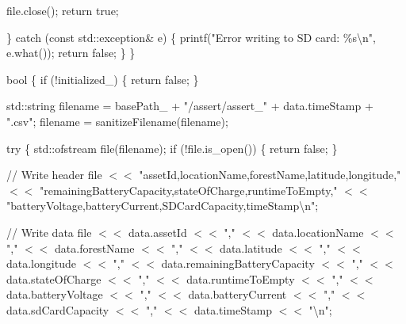 file.\+close(); return true;

\} catch (const std\+::exception\& e) \{ printf("{}\+Error writing to SD card\+: \%s\textbackslash{}n"{}, e.\+what()); return false; \} \}

bool  \{ if (!initialized\+\_\+) \{ return false; \}

std\+::string filename = base\+Path\+\_\+ + "{}/assert/assert\+\_\+"{} + data.\+time\+Stamp + "{}.\+csv"{}; filename = sanitize\+Filename(filename);

try \{ std\+::ofstream file(filename); if (!file.is\+\_\+open()) \{ return false; \}

// Write header file \texorpdfstring{$<$}{<}\texorpdfstring{$<$}{<} "{}asset\+Id,location\+Name,forest\+Name,latitude,longitude,"{} \texorpdfstring{$<$}{<}\texorpdfstring{$<$}{<} "{}remaining\+Battery\+Capacity,state\+Of\+Charge,runtime\+To\+Empty,"{} \texorpdfstring{$<$}{<}\texorpdfstring{$<$}{<} "{}battery\+Voltage,battery\+Current,\+SDCard\+Capacity,time\+Stamp\textbackslash{}n"{};

// Write data file \texorpdfstring{$<$}{<}\texorpdfstring{$<$}{<} data.\+asset\+Id \texorpdfstring{$<$}{<}\texorpdfstring{$<$}{<} "{},"{} \texorpdfstring{$<$}{<}\texorpdfstring{$<$}{<} data.\+location\+Name \texorpdfstring{$<$}{<}\texorpdfstring{$<$}{<} "{},"{} \texorpdfstring{$<$}{<}\texorpdfstring{$<$}{<} data.\+forest\+Name \texorpdfstring{$<$}{<}\texorpdfstring{$<$}{<} "{},"{} \texorpdfstring{$<$}{<}\texorpdfstring{$<$}{<} data.\+latitude \texorpdfstring{$<$}{<}\texorpdfstring{$<$}{<} "{},"{} \texorpdfstring{$<$}{<}\texorpdfstring{$<$}{<} data.\+longitude \texorpdfstring{$<$}{<}\texorpdfstring{$<$}{<} "{},"{} \texorpdfstring{$<$}{<}\texorpdfstring{$<$}{<} data.\+remaining\+Battery\+Capacity \texorpdfstring{$<$}{<}\texorpdfstring{$<$}{<} "{},"{} \texorpdfstring{$<$}{<}\texorpdfstring{$<$}{<} data.\+state\+Of\+Charge \texorpdfstring{$<$}{<}\texorpdfstring{$<$}{<} "{},"{} \texorpdfstring{$<$}{<}\texorpdfstring{$<$}{<} data.\+runtime\+To\+Empty \texorpdfstring{$<$}{<}\texorpdfstring{$<$}{<} "{},"{} \texorpdfstring{$<$}{<}\texorpdfstring{$<$}{<} data.\+battery\+Voltage \texorpdfstring{$<$}{<}\texorpdfstring{$<$}{<} "{},"{} \texorpdfstring{$<$}{<}\texorpdfstring{$<$}{<} data.\+battery\+Current \texorpdfstring{$<$}{<}\texorpdfstring{$<$}{<} "{},"{} \texorpdfstring{$<$}{<}\texorpdfstring{$<$}{<} data.\+sd\+Card\+Capacity \texorpdfstring{$<$}{<}\texorpdfstring{$<$}{<} "{},"{} \texorpdfstring{$<$}{<}\texorpdfstring{$<$}{<} data.\+time\+Stamp \texorpdfstring{$<$}{<}\texorpdfstring{$<$}{<} "{}\textbackslash{}n"{};

